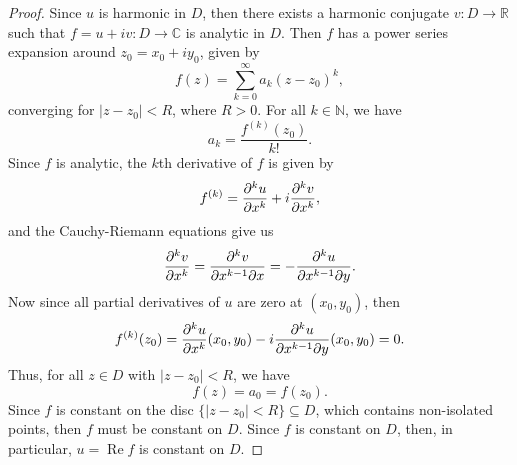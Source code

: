 \documentclass[12pt]{article}
\newcommand{\N}{\mathbb{N}}
\newcommand{\R}{\mathbb{R}}
\newcommand{\C}{\mathbb{C}}
\newcommand{\pd}[3][1]{\ifx1#1{\frac{\partial #2}{\partial#3}}\else{\frac{\partial^{#1}#2}{\partial#3^{#1}}}\fi}
\newcommand{\dd}{\partial}
\begin{document}
\begin{proof}
    Since $u$ is harmonic in $D$, then there exists a harmonic conjugate $v : D \to \R$ such that $f = u + iv : D \to \C$ is analytic in $D$. Then $f$ has a power series expansion around $z_0 = x_0 + iy_0$, given by
    \[
        f(z) = \sum_{k=0}^\infty a_k (z - z_0)^k,
    \]
    converging for $|z - z_0| < R$, where $R > 0$. For all $k \in \N$, we have
    \[
        a_k = \frac{f^{(k)}(z_0)}{k!}.
    \]
    Since $f$ is analytic, the $k$th derivative of $f$ is given by
    \[
        f^{(k)} = \pd[k]{u}{x} + i \pd[k]{v}{x},
    \]
    and the Cauchy-Riemann equations give us
    \[
        \pd[k]{v}{x} = \frac{\dd^k v}{\dd x^{k-1} \dd x} = - \frac{\dd^k u}{\dd x^{k-1} \dd y}.
    \]
    Now since all partial derivatives of $u$ are zero at $(x_0, y_0)$, then
    \[
        f^{(k)}(z_0) = \pd[k]{u}{x}(x_0, y_0) - i \frac{\dd^k u}{\dd x^{k-1} \dd y}(x_0, y_0) = 0.
    \]
    Thus, for all $z \in D$ with $|z - z_0| < R$, we have
    \[
        f(z) = a_0 = f(z_0).
    \]
    Since $f$ is constant on the disc $\{|z - z_0| < R\} \subseteq D$, which contains non-isolated points, then $f$ must be constant on $D$. Since $f$ is constant on $D$, then, in particular, $u = \operatorname{Re} f$ is constant on $D$.
    
\end{proof}
\end{document}
